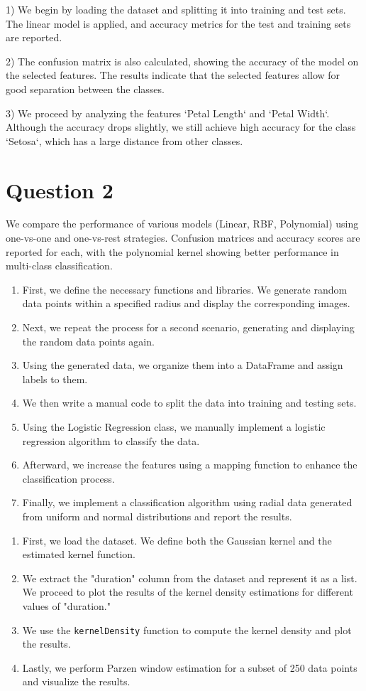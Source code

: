 \documentclass[DIV=calc, paper=a4, fontsize=11pt, twocolumn]{scrartcl}	 %
\begin{document}
1) We begin by loading the dataset and splitting it into training and test sets. 
   The linear model is applied, and accuracy metrics for the test and training 
   sets are reported.

2) The confusion matrix is also calculated, showing the accuracy of the model on 
   the selected features. The results indicate that the selected features allow 
   for good separation between the classes.

3) We proceed by analyzing the features `Petal Length` and `Petal Width`. Although 
   the accuracy drops slightly, we still achieve high accuracy for the class `Setosa`, 
   which has a large distance from other classes.


\section*{\small{Question 2}}

We compare the performance of various models (Linear, RBF, Polynomial) using one-vs-one and one-vs-rest strategies. 
Confusion matrices and accuracy scores are reported for each, with the polynomial kernel showing better performance 
in multi-class classification.

\begin{enumerate}
    \item First, we define the necessary functions and libraries. We generate random data points within a specified 
    radius and display the corresponding images.
    \item Next, we repeat the process for a second scenario, generating and displaying the random data points again.
    \item Using the generated data, we organize them into a DataFrame and assign labels to them.
    \item We then write a manual code to split the data into training and testing sets.
    \item Using the Logistic Regression class, we manually implement a logistic regression algorithm to classify the data.
    \item Afterward, we increase the features using a mapping function to enhance the classification process.
    \item Finally, we implement a classification algorithm using radial data generated from uniform and normal distributions 
    and report the results.
\end{enumerate}


\begin{enumerate}
    \item First, we load the dataset. We define both the Gaussian kernel and the estimated kernel function.
    \item We extract the "duration" column from the dataset and represent it as a list. We proceed to plot 
    the results of the kernel density estimations for different values of "duration."
    \item We use the \texttt{kernelDensity} function to compute the kernel density and plot the results.
    \item Lastly, we perform Parzen window estimation for a subset of 250 data points and visualize the results.
\end{enumerate}
\end{document}

